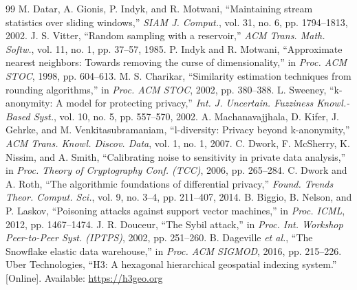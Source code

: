 \documentclass[10pt,journal,compsoc]{IEEEtran}
\begin{document}
\begin{thebibliography}{99}
 M. Datar, A. Gionis, P. Indyk, and R. Motwani, ``Maintaining stream statistics over sliding windows,'' \emph{SIAM J. Comput.}, vol. 31, no. 6, pp. 1794--1813, 2002.
 J. S. Vitter, ``Random sampling with a reservoir,'' \emph{ACM Trans. Math. Softw.}, vol. 11, no. 1, pp. 37--57, 1985.
 P. Indyk and R. Motwani, ``Approximate nearest neighbors: Towards removing the curse of dimensionality,'' in \emph{Proc. ACM STOC}, 1998, pp. 604--613.
 M. S. Charikar, ``Similarity estimation techniques from rounding algorithms,'' in \emph{Proc. ACM STOC}, 2002, pp. 380--388.
 L. Sweeney, ``k-anonymity: A model for protecting privacy,'' \emph{Int. J. Uncertain. Fuzziness Knowl.-Based Syst.}, vol. 10, no. 5, pp. 557--570, 2002.
 A. Machanavajjhala, D. Kifer, J. Gehrke, and M. Venkitasubramaniam, ``l-diversity: Privacy beyond k-anonymity,'' \emph{ACM Trans. Knowl. Discov. Data}, vol. 1, no. 1, 2007.
 C. Dwork, F. McSherry, K. Nissim, and A. Smith, ``Calibrating noise to sensitivity in private data analysis,'' in \emph{Proc. Theory of Cryptography Conf. (TCC)}, 2006, pp. 265--284.
 C. Dwork and A. Roth, ``The algorithmic foundations of differential privacy,'' \emph{Found. Trends Theor. Comput. Sci.}, vol. 9, no. 3--4, pp. 211--407, 2014.
 B. Biggio, B. Nelson, and P. Laskov, ``Poisoning attacks against support vector machines,'' in \emph{Proc. ICML}, 2012, pp. 1467--1474.
 J. R. Douceur, ``The Sybil attack,'' in \emph{Proc. Int. Workshop Peer-to-Peer Syst. (IPTPS)}, 2002, pp. 251--260.
 B. Dageville \emph{et al.}, ``The Snowflake elastic data warehouse,'' in \emph{Proc. ACM SIGMOD}, 2016, pp. 215--226.
 Uber Technologies, ``H3: A hexagonal hierarchical geospatial indexing system.'' [Online]. Available: \url{https://h3geo.org}
\end{thebibliography}

\appendices

\end{document}
